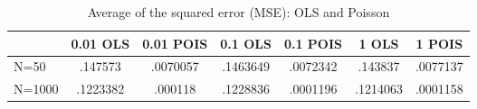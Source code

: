 \begin{table}[htbp]\centering
\caption{Average of the squared error (MSE): OLS and Poisson}
\begin{tabular}{l*{6}{c}}
\toprule
            &    0.01 OLS&   0.01 POIS&     0.1 OLS&    0.1 POIS&       1 OLS&      1 POIS\\
\midrule
N=50        &     .147573&    .0070057&    .1463649&    .0072342&     .143837&    .0077137\\
N=1000      &    .1223382&     .000118&    .1228836&    .0001196&    .1214063&    .0001158\\
\bottomrule
\end{tabular}
\end{table}
